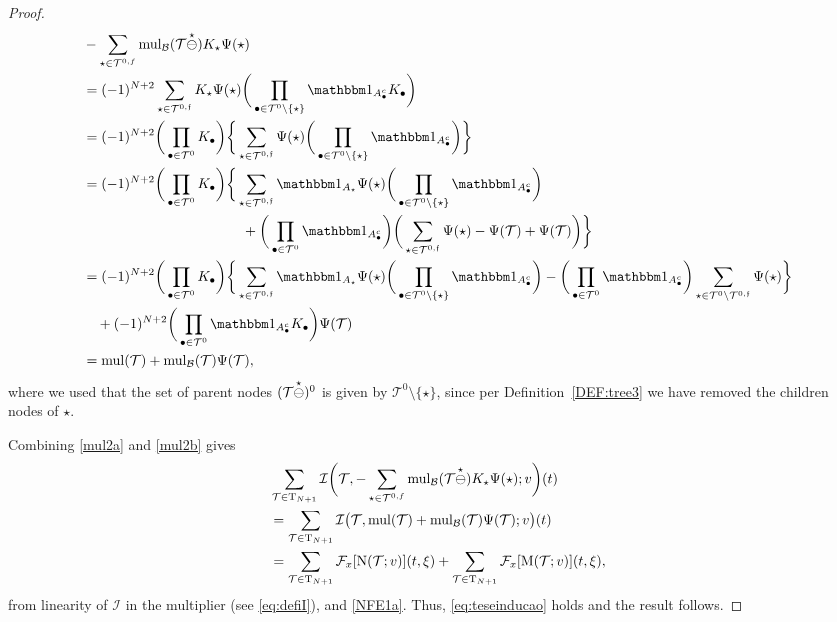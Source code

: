 \documentclass[%
11pt,  reqno]{amsart}
\makeatletter
\newcommand{\5}{\textup{V}}
\newcommand{\noi}{\noindent}
\newcommand{\ind}{\mathbbm 1}
\theoremstyle{remark}
\newcommand{\bul}{\bullet}
\newcommand{\TT}{\mathcal{T}}
\newcommand{\Tr}{\mathrm{T}}
\newcommand{\Ft}{{\mathcal{F}}}
\newcommand{\ff}{\mathfrak{f}}
\DeclareMathOperator{\mul}{mul}
\DeclareMathOperator{\mulB}{mul_{\mathcal{B}}}
\def\<#1>{\csname MH@symb@#1\endcsname}
\newcommand{\Ical}{\mathcal{I}}
\numberwithin{equation}{section}
\numberwithin{theorem}{section}
\newcommand{\MM}{\mathrm{M}}
\newcommand{\NN}{\mathrm{N}}
\makeatother
\begin{document}
\begin{proof}
\noi
\begin{align}
\label{mul2b}
\begin{split}
& 
-\sum_{\star\in\TT^{0,f}}
\mulB(\TT \overset{\star}{\ominus}  \<1> ) K_\star \Psi(\star)
\\
&
=
(-1)^{ N+2} \sum_{\star\in \TT^{0,\ff}} K_\star \Psi(\star)\bigg( \prod_{\bul \in \TT^0 \setminus \{\star\}} \ind_{A_\bul^c} K_\bul  \bigg)
\\
& =
(-1)^{ N+2} \bigg( \prod_{\bul \in \TT^0} K_\bul \bigg)
\bigg\{ \sum_{\star \in \TT^{0,\ff}} \Psi(\star) \bigg(\prod_{\bul \in \TT^0 \setminus\{\star\}} \ind_{A^c_\bul}  \bigg) \bigg\}
\\
& = (-1)^{ N+2} \bigg( \prod_{\bul \in \TT^0} K_\bul \bigg)
\bigg\{ \sum_{\star \in \TT^{0,\ff}} \ind_{A_\star} \Psi(\star) \bigg(\prod_{\bul \in \TT^0 \setminus\{\star\}} \ind_{A^c_\bul}\bigg)\\
& \hspace{4cm}
+ \bigg(\prod_{\bul\in \TT^0} \ind_{A_\bul^c} \bigg) \bigg(\sum_{\star\in \TT^{0,\ff}}\Psi(\star) - \Psi(\TT) + \Psi(\TT)
\bigg)  \bigg\}
\\
& =
(-1)^{ N+2} \bigg( \prod_{\bul \in \TT^0} K_\bul \bigg) \bigg\{ \sum_{\star \in \TT^{0,\ff}} \ind_{A_\star} \Psi(\star) \bigg( \prod_{\bul \in \TT^{0} \setminus \{\star\}} \ind_{A_\bul^c} \bigg) - \bigg(\prod_{\bul\in \TT^0} \ind_{A_\bul^c} \bigg) \sum_{\star \in \TT^{0} \setminus \TT^{0,\ff}} \Psi(\star) \bigg\} \\
&
\quad + (-1)^{ N+2} \bigg(\prod_{\bul \in \TT^0} \ind_{A^c_\bul} K_\bul \bigg) \Psi(\TT) \\
&  = \mul(\TT) + \mulB(\TT) \Psi(\TT),
\end{split}
\end{align}
where we used that the set of parent nodes $(\TT \overset{\star}{\ominus} \<1>)^0$ is given by $\TT^0 \setminus\{\star\}$, since per Definition~\ref{DEF:tree3} we have removed the children nodes of $\star$.


Combining \eqref{mul2a} and \eqref{mul2b} gives
\begin{align}
& \sum_{\TT\in \Tr_{N+1}}
\Ical 
\bigg(\TT,
-\sum_{\star\in\TT^{0,f}}
\mulB(\TT \overset{\star}{\ominus}  \<1> ) K_\star \Psi(\star) ;
v
\bigg) (t)
\\
&
=
\sum_{\TT\in \Tr_{N+1}}  \Ical \big(\TT, \mul(\TT) + \mulB(\TT) \Psi(\TT) ; v \big) (t)
 \\
& 
= 
 \sum_{\TT\in \Tr_{N+1}}  \Ft_x [\NN(\TT ; v ) ](t, \xi) 
+  \sum_{\TT\in \Tr_{N+1}} \Ft_x [\MM(\TT ; v ) ] (t, \xi),
\end{align}
from linearity of $\Ical$ in the multiplier (see \eqref{eq:defiI}), and \eqref{NFE1a}. Thus, \eqref{eq:teseinducao} holds and the result follows. \qedhere



\end{proof}
\end{document}
